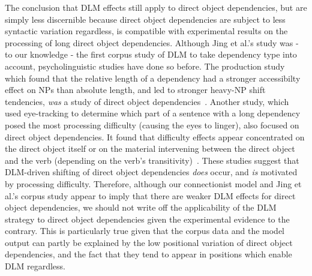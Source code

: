 \documentclass{article}
\begin{document}
The conclusion that DLM effects still apply to direct object dependencies, but are simply less discernible because direct object dependencies are subject to less syntactic variation regardless, is compatible with experimental results on the processing of long direct object dependencies. Although Jing et al.'s study was - to our knowledge - the first corpus study of DLM to take dependency type into account, psycholinguistic studies have done so before. The production study which found that the relative length of a dependency had a stronger accessibilty effect on NPs than absolute length, and led to stronger heavy-NP shift tendencies, \textit{was} a study of direct object dependencies~\cite{stallings2011}. Another study, which used eye-tracking to determine which part of a sentence with a long dependency posed the most processing difficulty (causing the eyes to linger), also focused on direct object dependencies. It found that difficulty effects appear concentrated on the direct object itself or on the material intervening between the direct object and the verb (depending on the verb's transitivity)~\cite{staub2006}. These studies suggest that DLM-driven shifting of direct object dependencies \textit{does} occur, and \textit{is} motivated by processing difficulty. Therefore, although our connectionist model and Jing et al.'s corpus study appear to imply that there are weaker DLM effects for direct object dependencies, we should not write off the applicability of the DLM strategy to direct object dependencies given the experimental evidence to the contrary. This is particularly true given that the corpus data and the model output can partly be explained by the low positional variation of direct object dependencies, and the fact that they tend to appear in positions which enable DLM regardless.  
\end{document}
